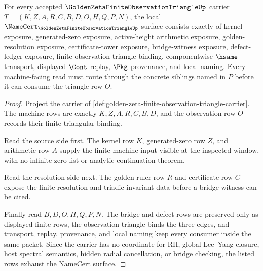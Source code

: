 \begin{theorem}
\label{thm:golden-zeta-finite-observation-triangle-namecert-obligations}
For every accepted $\GoldenZetaFiniteObservationTriangleUp$ carrier $T=(K,Z,A,R,C,B,D,O,H,Q,P,N)$, the local $\NameCert_{\GoldenZetaFiniteObservationTriangleUp}$ surface consists exactly of kernel exposure, generated-zero exposure, active-height arithmetic exposure, golden-resolution exposure, certificate-tower exposure, bridge-witness exposure, defect-ledger exposure, finite observation-triangle binding, componentwise $\hsame$ transport, displayed $\Cont$ replay, $\Pkg$ provenance, and local naming. Every machine-facing read must route through the concrete siblings named in $P$ before it can consume the triangle row $O$.
\end{theorem}
\begin{proof}
Project the carrier of \autoref{def:golden-zeta-finite-observation-triangle-carrier}. The machine rows are exactly $K,Z,A,R,C,B,D$, and the observation row $O$ records their finite triangular binding.

Read the source side first. The kernel row $K$, generated-zero row $Z$, and arithmetic row $A$ supply the finite machine input visible at the inspected window, with no infinite zero list or analytic-continuation theorem.

Read the resolution side next. The golden ruler row $R$ and certificate row $C$ expose the finite resolution and triadic invariant data before a bridge witness can be cited.

Finally read $B,D,O,H,Q,P,N$. The bridge and defect rows are preserved only as displayed finite rows, the observation triangle binds the three edges, and transport, replay, provenance, and local naming keep every consumer inside the same packet. Since the carrier has no coordinate for RH, global Lee--Yang closure, host spectral semantics, hidden radial cancellation, or bridge checking, the listed rows exhaust the NameCert surface.
\end{proof}

